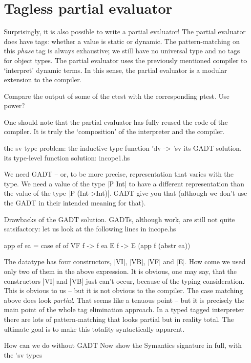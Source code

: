 \documentclass[preprint]{sigplanconf}
\begin{document}
\section{Tagless partial evaluator}

Surprisingly, it is also possible to write a partial evaluator!  The
partial evaluator does have tags: whether a value is static or dynamic.
The pattern-matching on this \emph{phase} tag is always exhaustive; we still
have no universal type and no tags for object types.  The partial
evaluator uses the previously mentioned compiler to `interpret' dynamic
terms.  In this sense, the partial evaluator is a modular extension to
the compiler.

Compare the output of some of the ctest with the corresponding
ptest. Use power?

One should note that the partial evaluator has fully reused the code
of the compiler. It is truly the `composition' of the interpreter and
the compiler.


the sv type problem: the inductive type function 'dv -> 'sv
its GADT solution. 
its type-level function solution: incope1.hs 

We need GADT -- or, to be more precise,
representation that varies with the type. We need a value of the type
|P Int| to have a different representation than the value of the type 
|P (Int->Int)|. GADT give you that (although we don't use the GADT in
their intended meaning for that). 

Drawbacks of the GADT solution. GADTs, although work, are still not
quite satsifactory: let us look at the following lines in incope.hs
\begin{code}
    app ef ea = case ef of
                        VF f -> f ea
                        E  f -> E (app f (abstr ea))
\end{code}
The datatype has four constructors, |VI|, |VB|, |VF| and |E|. How come we used
only two of them in the above expression. It is obvious, one may say,
that the constructors |VI| and |VB| just can't occur, because of the
typing consideration. This is obvious to us -- but it is not obvious
to the compiler. The case matching above does look \emph{partial}. That
seems like a tenuous point -- but it is precisely the main point of
the whole tag elimination approach. In a typed tagged interpreter
there are lots of pattern-matching that looks partial but in reality
total. The ultimate goal is to make this totality syntactically
apparent.


How can we do without GADT
Now show the Symantics signature in full, with the 'sv types
\end{document}
